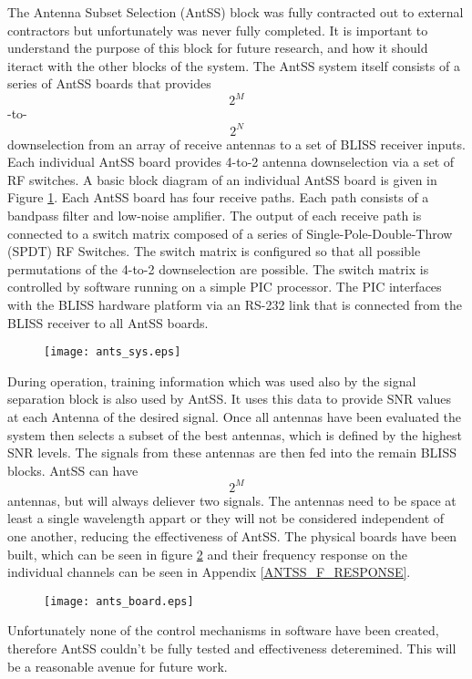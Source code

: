 The Antenna Subset Selection (AntSS) block was fully contracted out to external contractors but unfortunately was never fully completed.  It is important to understand the purpose of this block for future research, and how it should iteract with the other blocks of the system.  The AntSS system itself consists of a series of AntSS boards that provides $$2^{M}$$ -to-$$2^{N}$$ downselection from an array of receive antennas to a set of BLISS receiver inputs. Each individual AntSS board provides 4-to-2 antenna downselection via a set of RF switches. A basic block diagram of an individual AntSS board is given in Figure \ref{ants_sys}.  Each AntSS board has four receive paths. Each path consists of a bandpass filter and low-noise amplifier. The output of each receive path is connected to a switch matrix composed of a series of Single-Pole-Double-Throw (SPDT) RF Switches. The switch matrix is configured so that all possible permutations of the 4-to-2 downselection are possible. The switch matrix is controlled by software running on a simple PIC processor. The PIC interfaces with the BLISS hardware platform via an RS-232 link that is connected from the BLISS receiver to all AntSS boards.\\

\begin{figure}\label{ants_sys}
\texttt{[image: ants\_sys.eps]}
\end{figure}

During operation, training information which was used also by the signal separation block is also used by AntSS.  It uses this data to provide SNR values at each Antenna of the desired signal.  Once all antennas have been evaluated the system then selects a subset of the best antennas, which is defined by the highest SNR levels.  The signals from these antennas are then fed into the remain BLISS blocks.  AntSS can have $$2^{M}$$ antennas, but will always deliever two signals.  The antennas need to be space at least a single wavelength appart or they will not be considered independent of one another, reducing the effectiveness of AntSS.  The physical boards have been built, which can be seen in figure \ref{antss_boards} and their frequency response on the individual channels can be seen in Appendix \ref{ANTSS_F_RESPONSE}.\\

\begin{figure}\label{antss_boards}
\texttt{[image: ants\_board.eps]}
\end{figure}

Unfortunately none of the control mechanisms in software have been created, therefore AntSS couldn't be fully tested and effectiveness deteremined.  This will be a reasonable avenue for future work.\\

